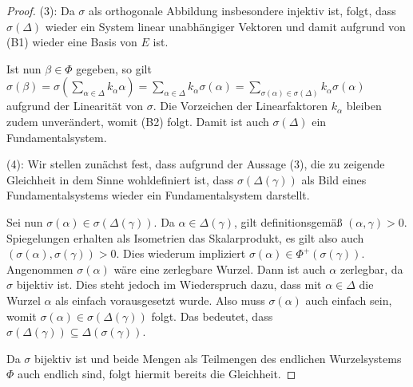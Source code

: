 \begin{proof}
  (3): 
  Da $\sigma$ als orthogonale Abbildung insbesondere injektiv ist, folgt, dass $\sigma(\Delta)$ wieder ein System linear unabhängiger Vektoren und damit aufgrund von (B1) wieder eine Basis von $E$ ist.
  
  Ist nun $\beta \in \Phi$ gegeben, so gilt
  $\sigma(\beta) 
    = \sigma(\sum_{\alpha \in \Delta} k_\alpha \alpha)
    = \sum_{\alpha \in \Delta} k_\alpha \sigma(\alpha)
    = \sum_{\sigma(\alpha) \in \sigma(\Delta)} k_\alpha \sigma(\alpha)
  $
  aufgrund der Linearität von $\sigma$.
  Die Vorzeichen der Linearfaktoren $k_\alpha$ bleiben zudem unverändert, womit (B2) folgt.
  Damit ist auch $\sigma(\Delta)$ ein Fundamentalsystem.

  (4):
  Wir stellen zunächst fest, dass aufgrund der Aussage (3), die zu zeigende Gleichheit in dem Sinne wohldefiniert ist, dass $\sigma(\Delta(\gamma))$ als Bild eines Fundamentalsystems wieder ein Fundamentalsystem darstellt.

  Sei nun $\sigma(\alpha) \in \sigma(\Delta(\gamma))$.
  Da $\alpha \in \Delta(\gamma)$, gilt definitionsgemäß $(\alpha, \gamma) > 0$.
  Spiegelungen erhalten als Isometrien das Skalarprodukt, es gilt also auch $(\sigma(\alpha), \sigma(\gamma)) > 0$.
  Dies wiederum impliziert $\sigma(\alpha) \in \Phi^+(\sigma(\gamma))$.
  Angenommen $\sigma(\alpha)$ wäre eine zerlegbare Wurzel.
  Dann ist auch $\alpha$ zerlegbar, da $\sigma$ bijektiv ist.
  Dies steht jedoch im Wiederspruch dazu, dass mit $\alpha \in \Delta$ die Wurzel $\alpha$ als einfach vorausgesetzt wurde.
  Also muss $\sigma(\alpha)$ auch einfach sein, womit $\sigma(\alpha) \in \sigma(\Delta(\gamma))$ folgt.
  Das bedeutet, dass $\sigma(\Delta(\gamma)) \subseteq \Delta(\sigma(\gamma))$.
  
  Da $\sigma$ bijektiv ist und beide Mengen als Teilmengen des endlichen Wurzelsystems $\Phi$ auch endlich sind, folgt hiermit bereits die Gleichheit.
\end{proof}
